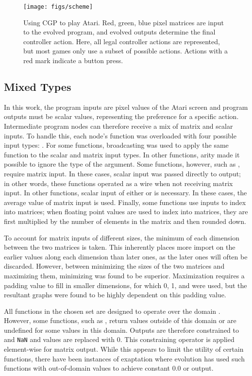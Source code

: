 \documentclass[sigconf,screen]{acmart}\settopmatter{printfolios=true,printacmref=false}
\begin{document}
\begin{figure*}[t]
  \centering
  \texttt{[image: figs/scheme]}
  \caption{Using CGP to play Atari. Red, green, blue pixel matrices are input to
    the evolved program, and evolved outputs determine the final controller
    action. Here, all legal controller actions are represented, but most games
    only use a subset of possible actions. Actions with a red mark indicate a
    button press.}
  \label{fig:scheme}
\end{figure*}

\subsection{Mixed Types}

In this work, the program inputs are pixel values of the Atari screen and
program outputs must be scalar values, representing the preference for a
specific action. Intermediate program nodes can therefore receive a mix of
matrix and scalar inputs. To handle this, each node's function was overloaded
with four possible input types: . For some functions, broadcasting was used to apply the same function
to the scalar and matrix input types. In other functions, arity made it possible
to ignore the type of the  argument. Some functions, however, such as
, require matrix input. In these cases, scalar  input was
passed directly to output; in other words, these functions operated as a wire
when not receiving matrix input. In other functions, scalar input of either 
or  is necessary. In these cases, the average value of matrix input is used.
Finally, some functions use inputs to index into matrices; when floating point
values are used to index into matrices, they are first multiplied by the number
of elements in the matrix and then rounded down.



To account for matrix inputs of different sizes, the minimum of each dimension
between the two matrices is taken. This inherently places more import on the
earlier values along each dimension than later ones, as the later ones will
often be discarded. However, between minimizing the sizes of the two matrices
and maximizing them, minimizing was found to be superior. Maximization requires
a padding value to fill in smaller dimensions, for which 0, 1, and  were
used, but the resultant graphs were found to be highly dependent on this padding
value.

All functions in the chosen set are designed to operate over the domain . However, some functions, such as , return values outside
of this domain or are undefined for some values in this domain. Outputs are
therefore constrained to  and \texttt{NaN} and  values are
replaced with 0. This constraining operator is applied element-wise for matrix
output. While this appears to limit the utility of certain functions, there have
been instances of exaptation where evolution has used such functions with
out-of-domain values to achieve constant 0.0 or  output.
\end{document}
